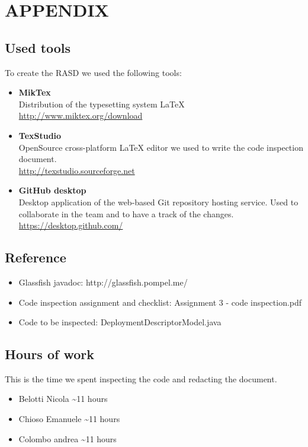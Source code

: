\section{APPENDIX}

\subsection{Used tools}
To create the RASD we used the following tools:
\begin{itemize}
	\item \textbf{MikTex} \\ Distribution of the typesetting system LaTeX \\ \url{http://www.miktex.org/download } 
	\item \textbf{TexStudio}\\ OpenSource cross-platform LaTeX editor we used to write the code inspection document. \\ \url{http://texstudio.sourceforge.net  } 
	\item \textbf{GitHub desktop}\\ Desktop application of the web-based Git repository hosting service. Used to collaborate in the team and to have a track of the changes.  \\ \url{https://desktop.github.com/ } 
\end{itemize}

\subsection{Reference}
\begin{itemize}
	\item Glassfish javadoc: http://glassfish.pompel.me/
	\item Code inspection assignment and checklist: Assignment 3 - code inspection.pdf
	\item Code to be inspected: DeploymentDescriptorModel.java
\end{itemize}

\subsection{Hours of work}
This is the time we spent inspecting the code and redacting the document.
\begin{itemize}
	\item {Belotti Nicola} \textasciitilde 11 hours
	\item {Chioso Emanuele} \textasciitilde 11 hours
	\item {Colombo andrea} \textasciitilde 11 hours
\end{itemize}
